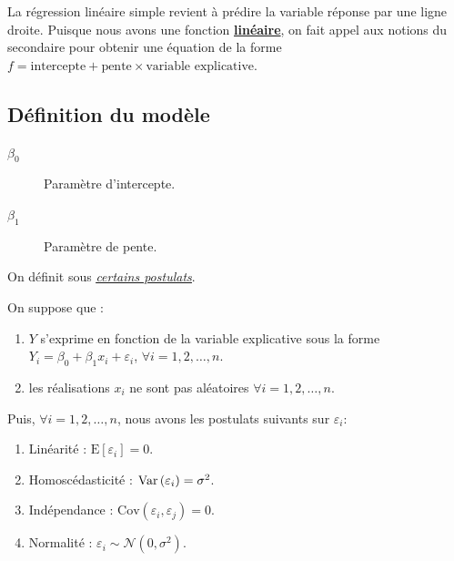\documentclass[french]{article}
\begin{document}
\begin{multicols*}{2}
\bigskip

\begin{rappel_enhanced}[Contexte]
La régression linéaire simple revient à prédire la variable réponse par une ligne droite. Puisque nous avons une fonction \underline{\textbf{linéaire}}, on fait appel aux notions du secondaire pour obtenir une équation de la forme $f = \text{intercepte} + \text{pente} \times \text{variable explicative}$.
\end{rappel_enhanced}


\subsection{Définition du modèle}
\begin{distributions}[Notation]
\begin{description}
	\item[$\beta_{0}$]	Paramètre d'intercepte.
	\item[$\beta_{1}$]	Paramètre de pente.
\end{description}
\end{distributions}

\begin{definitionNOHFILL}
On définit  sous \textit{\color{bleudefrance}\underline{\hyperlink{postulatsSLR}{\color{bleudefrance} certains postulats}}}.
\end{definitionNOHFILL}

\begin{definitionNOHFILLprop}
On suppose que : 
\begin{enumerate}
	\item	$Y$ s'exprime en fonction de la variable explicative sous la forme $Y_{i} = \beta_{0} + \beta_{1}x_{i} + \varepsilon_{i}$, $\forall i = 1, 2, \dots, n$.
	\item	les réalisations $x_{i}$ ne sont pas aléatoires $\forall i = 1, 2, \dots, n$.
\end{enumerate}

\bigskip

Puis, $\forall i = 1, 2, \dots, n$, nous avons les postulats suivants sur $\varepsilon_{i}$: 
\begin{enumerate}[label = $\mathbf{H}_{\arabic*}$]
	\item Linéarité : $\text{E}[\varepsilon_{i}] = 0$.
	\item Homoscédasticité : $\mathrm{Var} \left( \varepsilon_i \right)= \sigma^2$.
	\item Indépendance : $\text{Cov}(\varepsilon_{i}, \varepsilon_{j}) = 0$.
	\item Normalité : $\varepsilon_{i} \sim \mathcal{N}(0, \sigma^{2})$.
\end{enumerate}


\end{definitionNOHFILLprop}
\end{multicols*}
\end{document}
